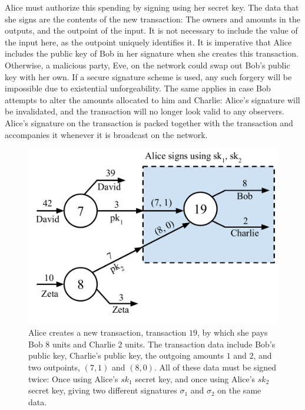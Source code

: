 Alice must authorize this spending by signing using her secret key.
The data that she signs are the contents of the new transaction:
The owners and amounts in the outputs, and the outpoint of the input.
It is not necessary to include the value of the input here, as the outpoint
uniquely identifies it. It is imperative that Alice includes the public key
of Bob in her signature when she creates this transaction. Otherwise, a malicious
party, Eve, on the network could swap out Bob's public key with her own. If a secure
signature scheme is used, any such forgery will be impossible due to existential
unforgeability. The same applies in case Bob attempts to alter the amounts allocated
to him and Charlie: Alice's signature will be invalidated, and the transaction will
no longer look valid to any observers. Alice's signature on the transaction is packed
together with the transaction and accompanies it whenever it is broadcast on the network.

\begin{figure}[h]
    \centering
    \includegraphics[width=0.65 \columnwidth,keepaspectratio]{figures/utxo-sig-multi.pdf}
    \caption{Alice creates a new transaction, transaction $19$, by which she pays Bob
             $8$ units
             and Charlie $2$ units.
             The transaction data include Bob's public key, Charlie's public key,
             the outgoing amounts $1$ and $2$, and two outpoints, $(7, 1)$ and $(8, 0)$.
             All of these data must be signed twice: Once using Alice's $sk_1$ secret key,
             and once using Alice's $sk_2$ secret key, giving two different signatures
             $\sigma_1$ and $\sigma_2$ on the same data.}
    \label{fig.utxo-sig-multi}
\end{figure}

